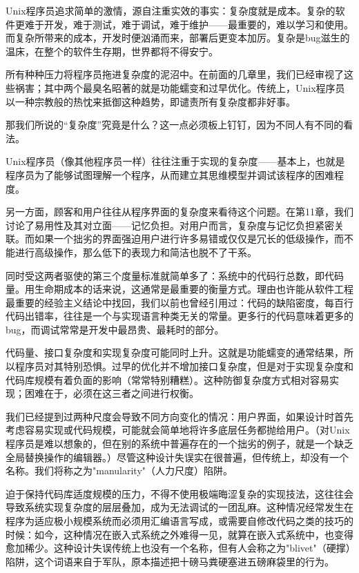 \documentclass[12pt,oneside]{ctexbook}
\begin{document}
\begin{common-format}
Unix程序员追求简单的激情，源自注重实效的事实：复杂度就是成本。复杂的软件更难于开发，难于测试，难于调试，难于维护——最重要的，难以学习和使用。而复杂所带来的成本，开发时便汹涌而来，部署后更变本加厉。复杂是bug滋生的温床，在整个的软件生存期，世界都将不得安宁。

所有种种压力将程序员拖进复杂度的泥沼中。在前面的几章里，我们已经审视了这些祸害；其中两个最臭名昭著的就是功能蠕变和过早优化。传统上，Unix程序员以一种宗教般的热忱来抵御这种趋势，即谴责所有复杂度都非好事。

那我们所说的“复杂度”究竟是什么？这一点必须板上钉钉，因为不同人有不同的看法。

Unix程序员（像其他程序员一样）往往注重于实现的复杂度——基本上，也就是程序员为了能够试图理解一个程序，从而建立其思维模型并调试该程序的困难程度。

另一方面，顾客和用户往往从程序界面的复杂度来看待这个问题。在第11章，我们讨论了易用性及其对立面——记忆负担。对用户而言，复杂度与记忆负担紧密关联。而如果一个拙劣的界面强迫用户进行许多易错或仅仅是冗长的低级操作，而不能进行高级操作，那么低下的表现力和简洁也脱不了干系。

同时受这两者驱使的第三个度量标准就简单多了：系统中的代码行总数，即代码量。用生命期成本的话来说，这通常是最重要的衡量方式。理由也许能从软件工程最重要的经验主义结论中找回，我们以前也曾经引用过：代码的缺陷密度，每百行代码出错率，往往是一个与实现语言种类无关的常量。更多行的代码意味着更多的bug，而调试常常是开发中最昂贵、最耗时的部分。

代码量、接口复杂度和实现复杂度可能同时上升。这就是功能蠕变的通常结果，所以程序员对其特别恐惧。过早的优化并不增加接口复杂度，但是对于实现复杂度和代码库规模有着负面的影响（常常特别糟糕）。这种防御复杂度方式相对容易实现；困难在于，必须在这三者之间进行权衡。

我们已经提到过两种尺度会导致不同方向变化的情况：用户界面，如果设计时首先考虑容易实现或代码规模，可能就会简单地将许多底层任务都抛给用户。（对Unix程序员是难以想象的，但在别的系统中普遍存在的一个拙劣的例子，就是一个缺乏全局替换操作的编辑器。）尽管这种设计失误实在很普遍，但传统上，却没有一个名称。我们将称之为"manularity"（人力尺度）陷阱。

迫于保持代码库适度规模的压力，不得不使用极端晦涩复杂的实现技法，这往往会导致系统实现复杂度的层层叠加，成为无法调试的一团乱麻。这种情况经常发生在程序为适应极小规模系统而必须用汇编语言写成，或需要自修改代码之类的技巧的时候：如今，这种情况在嵌入式系统之外难得一见，就算在嵌入式系统中，也变得愈加稀少。这种设计失误传统上也没有一个名称，但有人会称之为"blivet"（硬撑）陷阱，这个词语来自于军队，原本描述把十磅马粪硬塞进五磅麻袋里的行为。


\end{common-format}
\end{document}
